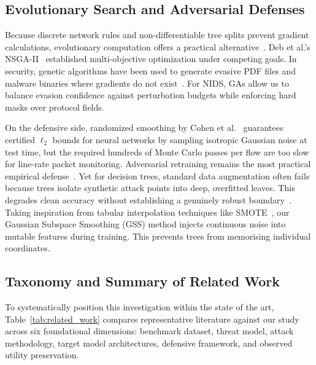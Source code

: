 \documentclass[final,5p,times,twocolumn]{elsarticle}
\begin{document}
\subsection{Evolutionary Search and Adversarial Defenses}
Because discrete network rules and non-differentiable tree splits prevent gradient calculations, evolutionary computation offers a practical alternative~\cite{deb2002nsga}. Deb et al.'s NSGA-II~\cite{deb2002nsga} established multi-objective optimization under competing goals. In security, genetic algorithms have been used to generate evasive PDF files and malware binaries where gradients do not exist~\cite{alhajjar2021adversarial}. For NIDS, GAs allow us to balance evasion confidence against perturbation budgets while enforcing hard masks over protocol fields.

On the defensive side, randomized smoothing by Cohen et al.~\cite{cohen2019certified} guarantees certified $\ell_2$ bounds for neural networks by sampling isotropic Gaussian noise at test time, but the required hundreds of Monte Carlo passes per flow are too slow for line-rate packet monitoring. Adversarial retraining remains the most practical empirical defense~\cite{madry2018towards}. Yet for decision trees, standard data augmentation often fails because trees isolate synthetic attack points into deep, overfitted leaves. This degrades clean accuracy without establishing a genuinely robust boundary~\cite{tramer2020adaptive}. Taking inspiration from tabular interpolation techniques like SMOTE~\cite{chawla2002smote}, our Gaussian Subspace Smoothing (GSS) method injects continuous noise into mutable features during training. This prevents trees from memorising individual coordinates.

\subsection{Taxonomy and Summary of Related Work}
To systematically position this investigation within the state of the art, Table~\ref{tab:related_work} compares representative literature against our study across six foundational dimensions: benchmark dataset, threat model, attack methodology, target model architectures, defensive framework, and observed utility preservation.
\end{document}
